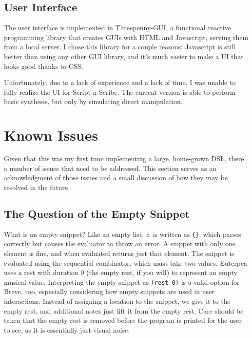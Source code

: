 \documentclass[nocopyrightspace,numbers,10pt]{sigplanconf}
\newcommand{\sns}{Script-n-Scribe}
\begin{document}
\subsection{User Interface}
\label{sub:impl:ui}

The user interface is implemented in Threepenny-GUI, a functional reactive
programming library that creates GUIs with HTML and Javascript, serving them
from a local server. I chose this library for a couple reasons: Javascript is
still better than using any other GUI library, and it's much easier to make a UI
that looks good thanks to CSS.

Unfortunately, due to a lack of experience and a lack of time, I was unable to
fully realize the UI for \sns{}. The current version is able to perform basic
synthesis, but only by simulating direct manipulation.

\section{Known Issues}
\label{sec:knownissues}

Given that this was my first time implementing a large, home-grown DSL, there
a number of issues that need to be addressed. This section serves as an
acknowledgment of those issues and a small discussion of how they may be
resolved in the future.

\subsection{The Question of the Empty Snippet}
\label{sub:knownissues:empty}

What is an empty snippet? Like an empty list, it is written as \texttt{\{\}},
which parses correctly but causes the evaluator to throw an error. A snippet
with only one element is fine, and when evaluated returns just that element. The
snippet is evaluated using the sequential combinator, which must take two
values. Euterpea uses a rest with duration 0 (the empty rest, if you will) to
represent an empty musical value. Interpreting the empty snippet as
\texttt{(rest 0)} is a valid option for Breve, too, especially considering how
empty snippets are used in user interactions. Instead of assigning a location to
the snippet, we give it to the empty rest, and additional notes just lift it
from the empty rest. Care should be taken that the empty rest is removed before
the program is printed for the user to see, as it is essentially just visual
noise.
\end{document}
